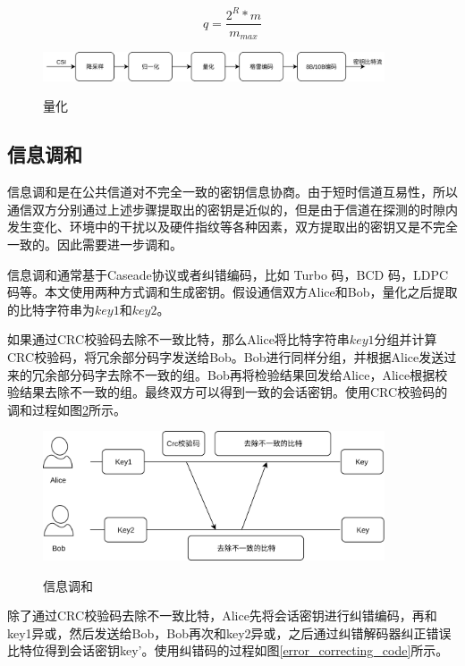 \documentclass[master]{seuthesis} %
\begin{document}
\begin{Main}
\begin{equation} \label{quantization_formula}
    q = \frac{2^R * m}{m_{max}}
\end{equation}

\begin{figure}
    \centering
    \includegraphics[width=0.9\textwidth]{images/quantization}
    \caption{量化}{} %
    \label{quantization}
\end{figure}

\subsection{信息调和}

信息调和是在公共信道对不完全一致的密钥信息协商。由于短时信道互易性，所以通信双方分别通过上述步骤提取出的密钥是近似的，但是由于信道在探测的时隙内发生变化、环境中的干扰以及硬件指纹等各种因素，双方提取出的密钥又是不完全一致的。因此需要进一步调和。

信息调和通常基于Caseade协议\cite{Kitano2007A}或者纠错编码，比如 Turbo 码，BCD 码，LDPC 码等\cite{peng2018securing}。本文使用两种方式调和生成密钥。假设通信双方Alice和Bob，量化之后提取的比特字符串为$key1$和$key2$。

如果通过CRC校验码去除不一致比特，那么Alice将比特字符串$key1$分组并计算CRC校验码，将冗余部分码字发送给Bob。Bob进行同样分组，并根据Alice发送过来的冗余部分码字去除不一致的组。Bob再将检验结果回发给Alice，Alice根据校验结果去除不一致的组。最终双方可以得到一致的会话密钥。使用CRC校验码的调和过程如图\ref{crc}所示。

\begin{figure}
    \centering
    \includegraphics[width=0.9\textwidth]{images/crc}
    \caption{信息调和}{} %
    \label{crc}
\end{figure}

除了通过CRC校验码去除不一致比特，Alice先将会话密钥进行纠错编码，再和key1异或，然后发送给Bob，Bob再次和key2异或，之后通过纠错解码器纠正错误比特位得到会话密钥key'。使用纠错码的过程如图\ref{error_correcting_code}所示。


\end{Main}
\end{document}

